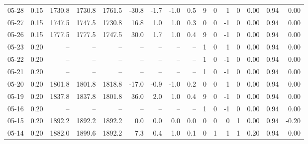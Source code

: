 \begin{threeparttable}
{\begin{tabular}{lrrrrrrrrrrrrrrr}
  05-28 &     0.15 & 1730.8 & 1730.8 & 1761.5 &      -30.8 &           -1.7 &                     -1.0 &                 0.5 &              9 &         0 &     1 &         0 &       0.00 &      0.94 &           0.00 \\
  05-27 &     0.15 & 1747.5 & 1747.5 & 1730.8 &       16.8 &            1.0 &                      1.0 &                 0.3 &              0 &         0 &    -1 &         0 &       0.00 &      0.94 &           0.00 \\
  05-26 &     0.15 & 1777.5 & 1777.5 & 1747.5 &       30.0 &            1.7 &                      1.0 &                 0.4 &              9 &         0 &    -1 &         0 &       0.00 &      0.94 &           0.00 \\
  05-23 &     0.20 &     -- &     -- &     -- &         -- &             -- &                       -- &                  -- &              1 &         0 &     1 &         0 &       0.00 &      0.94 &           0.00 \\
  05-22 &     0.20 &     -- &     -- &     -- &         -- &             -- &                       -- &                  -- &              1 &         0 &    -1 &         0 &       0.00 &      0.94 &           0.00 \\
  05-21 &     0.20 &     -- &     -- &     -- &         -- &             -- &                       -- &                  -- &              1 &         0 &    -1 &         0 &       0.00 &      0.94 &           0.00 \\
  05-20 &     0.20 & 1801.8 & 1801.8 & 1818.8 &      -17.0 &           -0.9 &                     -1.0 &                 0.2 &              0 &         0 &     1 &         0 &       0.00 &      0.94 &           0.00 \\
  05-19 &     0.20 & 1837.8 & 1837.8 & 1801.8 &       36.0 &            2.0 &                      1.0 &                 0.4 &              9 &         0 &    -1 &         0 &       0.00 &      0.94 &           0.00 \\
  05-16 &     0.20 &     -- &     -- &     -- &         -- &             -- &                       -- &                  -- &              1 &         0 &    -1 &         0 &       0.00 &      0.94 &           0.00 \\
  05-15 &     0.20 & 1892.2 & 1892.2 & 1892.2 &        0.0 &            0.0 &                      0.0 &                 0.0 &              0 &         0 &     0 &         1 &       0.00 &      0.94 &          -0.20 \\
  05-14 &     0.20 & 1882.0 & 1899.6 & 1892.2 &        7.3 &            0.4 &                      1.0 &                 0.1 &              0 &         1 &     1 &         1 &       0.20 &      0.94 &           0.00 \\

\end{tabular}}
\end{threeparttable}
